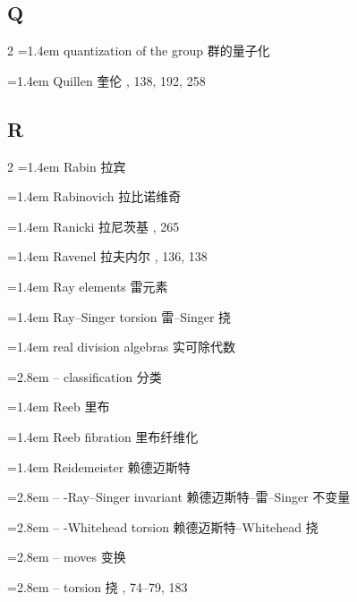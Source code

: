 \subsection*{Q}
\small
\begin{multicols}{2}
\noindent\hangindent=1.4em quantization of the group \quad 群的量子化 \par
\noindent\hangindent=1.4em Quillen \quad 奎伦 , 138, 192, 258\par
\end{multicols}

\subsection*{R}
\small
\begin{multicols}{2}
\noindent\hangindent=1.4em Rabin \quad 拉宾 \par
\noindent\hangindent=1.4em Rabinovich \quad 拉比诺维奇 \par
\noindent\hangindent=1.4em Ranicki \quad 拉尼茨基 , 265\par
\noindent\hangindent=1.4em Ravenel \quad 拉夫内尔 , 136, 138\par
\noindent\hangindent=1.4em Ray elements \quad 雷元素 \par
\noindent\hangindent=1.4em Ray--Singer torsion \quad 雷--Singer 挠 \par
\noindent\hangindent=1.4em real division algebras \quad 实可除代数 \quad\par
\noindent\hangindent=2.8em -- classification \quad 分类 \par
\noindent\hangindent=1.4em Reeb \quad 里布 \par
\noindent\hangindent=1.4em Reeb fibration \quad 里布纤维化 \par
\noindent\hangindent=1.4em Reidemeister \quad 赖德迈斯特 \quad\par
\noindent\hangindent=2.8em -- -Ray--Singer invariant \quad 赖德迈斯特--雷--Singer 不变量 \par
\noindent\hangindent=2.8em -- -Whitehead torsion \quad 赖德迈斯特--Whitehead 挠 \par
\noindent\hangindent=2.8em -- moves \quad 变换 \par
\noindent\hangindent=2.8em -- torsion \quad 挠 , 74--79, 183\par

\end{multicols}
